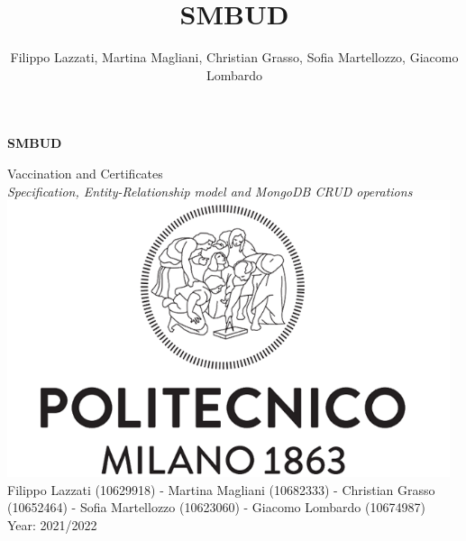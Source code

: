 \documentclass{article}
\title{SMBUD}
\author{Filippo Lazzati, Martina Magliani, Christian Grasso, Sofia Martellozzo, Giacomo Lombardo}
\begin{document}
\thispagestyle{empty}
\begin{titlepage}
    \begin{center}
       {\Huge \textbf{SMBUD}} %
       \vspace{0.5cm}
       \\
    \begin{LARGE}
        {Vaccination and Certificates}
        \vspace{1.0cm}
        \\
        {\textit{Specification, Entity-Relationship model and MongoDB CRUD operations}}
           \includegraphics[width=13cm]{logo/polimi.png}
          \vspace{1.5cm}\\
                  Filippo Lazzati (10629918) - Martina Magliani (10682333) - Christian Grasso (10652464) - Sofia Martellozzo (10623060) - Giacomo Lombardo (10674987)\\
       {Year: 2021/2022}
    \end{LARGE}  
   \end{center}
\end{titlepage}
\newpage
\tableofcontents %
\newpage
\end{document}
